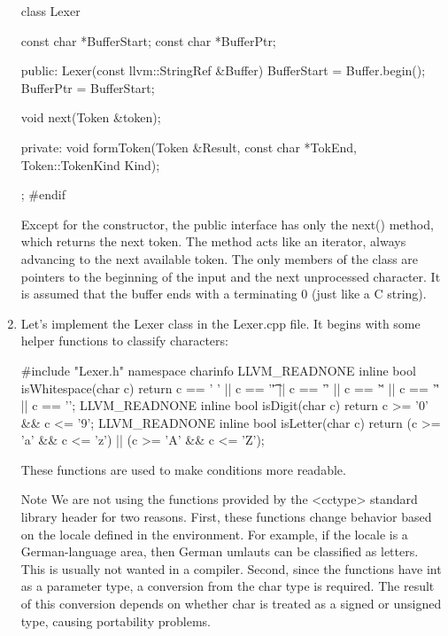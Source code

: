 \begin{enumerate}
\begin{cpp}
class Lexer {
    const char *BufferStart;
    const char *BufferPtr;

public:
    Lexer(const llvm::StringRef &Buffer) {
        BufferStart = Buffer.begin();
        BufferPtr = BufferStart;
    }

    void next(Token &token);

private:
    void formToken(Token &Result, const char *TokEnd,
                   Token::TokenKind Kind);
};
#endif
\end{cpp}

Except for the constructor, the public interface has only the next() method, which returns the next token. The method acts like an iterator, always advancing to the next available token. The only members of the class are pointers to the beginning of the input and the next unprocessed character. It is assumed that the buffer ends with a terminating 0 (just like a C string).

\item
Let’s implement the Lexer class in the Lexer.cpp file. It begins with some helper functions to classify characters:

\begin{cpp}
#include "Lexer.h"
namespace charinfo {
    LLVM_READNONE inline bool isWhitespace(char c) {
        return c == ' ' || c == '\t' || c == '\f' ||
        c == '\v' ||
        c == '\r' || c == '\n';
    }
    LLVM_READNONE inline bool isDigit(char c) {
        return c >= '0' && c <= '9';
    }
    LLVM_READNONE inline bool isLetter(char c) {
        return (c >= 'a' && c <= 'z') ||
        (c >= 'A' && c <= 'Z');
}
}
\end{cpp}

These functions are used to make conditions more readable.

\begin{myNotic}{Note}
We are not using the functions provided by the <cctype> standard library header for two reasons. First, these functions change behavior based on the locale defined in the environment. For example, if the locale is a German-language area, then German umlauts can be classified as letters. This is usually not wanted in a compiler. Second, since the functions have int as a parameter type, a conversion from the char type is required. The result of this conversion depends on whether char is treated as a signed or unsigned type, causing portability problems.
\end{myNotic}


\end{enumerate}
